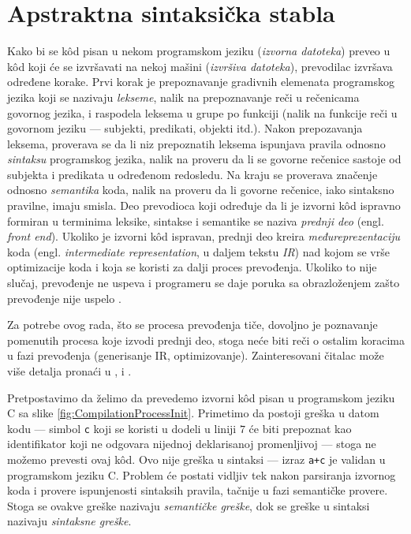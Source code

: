 \section{Apstraktna sintaksička stabla}
\label{sec:AST}

Kako bi se k\^od pisan u nekom programskom jeziku (\emph{izvorna datoteka}) preveo u k\^od koji će se izvršavati na nekoj mašini (\emph{izvršiva datoteka}), prevodilac izvršava određene korake. Prvi korak je prepoznavanje gradivnih elemenata programskog jezika koji se nazivaju \emph{lekseme}, nalik na prepoznavanje reči u rečenicama govornog jezika, i raspodela leksema u grupe po funkciji (nalik na funkcije reči u govornom jeziku --- subjekti, predikati, objekti itd.). Nakon prepozavanja leksema, proverava se da li niz prepoznatih leksema ispunjava pravila odnosno \emph{sintaksu} programskog jezika, nalik na proveru da li se govorne rečenice sastoje od subjekta i predikata u određenom redosledu. Na kraju se proverava značenje odnosno \emph{semantika} koda, nalik na proveru da li govorne rečenice, iako sintaksno pravilne, imaju smisla. Deo prevodioca koji određuje da li je izvorni k\^od ispravno formiran u terminima leksike, sintakse i semantike se naziva \emph{prednji deo} (engl. \emph{front end}). Ukoliko je izvorni k\^od ispravan, prednji deo kreira \emph{međureprezentaciju} koda (engl. \emph{intermediate representation}, u daljem tekstu \emph{IR}) nad kojom se vrše optimizacije koda i koja se koristi za dalji proces prevođenja. Ukoliko to nije slučaj, prevođenje ne uspeva i programeru se daje poruka sa obrazloženjem zašto prevođenje nije uspelo \cite{EngineeringCompilers}.

Za potrebe ovog rada, što se procesa prevođenja tiče, dovoljno je poznavanje pomenutih procesa koje izvodi prednji deo, stoga neće biti reči o ostalim koracima u fazi prevođenja (generisanje IR, optimizovanje). Zainteresovani čitalac može više detalja pronaći u \cite{DragonBook}, \cite{EngineeringCompilers} i \cite{CompilerConstruction}. 

Pretpostavimo da želimo da prevedemo izvorni k\^od pisan u programskom jeziku C sa slike \ref{fig:CompilationProcessInit}. Primetimo da postoji greška u datom kodu --- simbol \texttt{c} koji se koristi u dodeli u liniji $7$ će biti prepoznat kao identifikator koji ne odgovara nijednoj deklarisanoj promenljivoj --- stoga ne možemo prevesti ovaj k\^od. Ovo nije greška u sintaksi --- izraz \texttt{a+c} je validan u programskom jeziku C. Problem će postati vidljiv tek nakon parsiranja izvornog koda i provere ispunjenosti sintaksih pravila, tačnije u fazi semantičke provere. Stoga se ovakve greške nazivaju \emph{semantičke greške}, dok se greške u sintaksi nazivaju \emph{sintaksne greške}.

